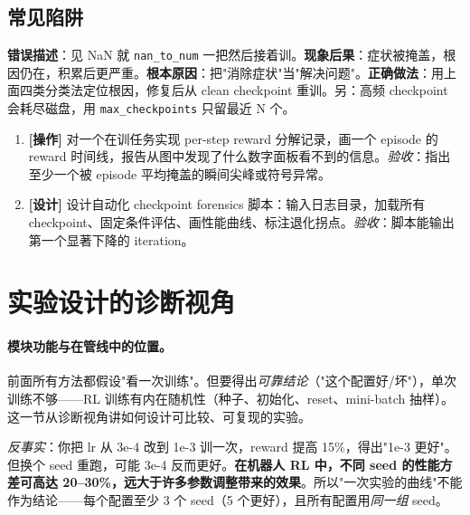 \subsection{常见陷阱}

\begin{pitfall}
\textbf{错误描述}：见 NaN 就 \verb|nan_to_num| 一把然后接着训。\textbf{现象后果}：症状被掩盖，根因仍在，积累后更严重。\textbf{根本原因}：把"消除症状"当"解决问题"。\textbf{正确做法}：用上面四类分类法定位根因，修复后从 clean checkpoint 重训。另：高频 checkpoint 会耗尽磁盘，用 \verb|max_checkpoints| 只留最近 N 个。
\end{pitfall}

\begin{practice}[本节动手任务]
\begin{enumerate}
  \item \textbf{[操作]} 对一个在训任务实现 per-step reward 分解记录，画一个 episode 的 reward 时间线，报告从图中发现了什么数字面板看不到的信息。\emph{验收}：指出至少一个被 episode 平均掩盖的瞬间尖峰或符号异常。
  \item \textbf{[设计]} 设计自动化 checkpoint forensics 脚本：输入日志目录，加载所有 checkpoint、固定条件评估、画性能曲线、标注退化拐点。\emph{验收}：脚本能输出第一个显著下降的 iteration。
\end{enumerate}
\end{practice}

\section{实验设计的诊断视角}
\label{sec:rlmc-diag-experiment}

\paragraph{模块功能与在管线中的位置。}前面所有方法都假设"看一次训练"。但要得出\emph{可靠结论}（"这个配置好/坏"），单次训练不够——RL 训练有内在随机性（种子、初始化、reset、mini-batch 抽样）。这一节从诊断视角讲如何设计可比较、可复现的实验。

\begin{insight}\label{ins:rlmc-diag-seed}
\emph{反事实}：你把 lr 从 3e-4 改到 1e-3 训一次，reward 提高 15\%，得出"1e-3 更好"。但换个 seed 重跑，可能 3e-4 反而更好。\textbf{在机器人 RL 中，不同 seed 的性能方差可高达 20--30\%，远大于许多参数调整带来的效果}。所以"一次实验的曲线"不能作为结论——每个配置至少 3 个 seed（5 个更好），且所有配置用\emph{同一组} seed。
\end{insight}

